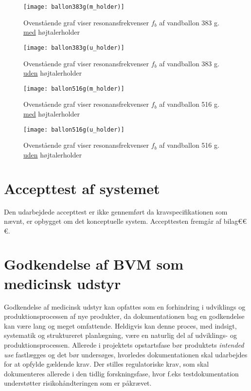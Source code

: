 \begin{figure}[htbp]
  \begin{minipage}[b]{1\linewidth}
    \centering
    \texttt{[image: ballon383g(m\_holder)]}
    \caption{Ovenstående graf viser resonansfrekvenser $f_{b}$  af vandballon 383 g. \underline{med} højtalerholder}
    \label{fig:ballon216g(m_holder)}
    \label{fig:ballon383g(m_holder)}
  \end{minipage}
  \hspace{1cm}
  \begin{minipage}[b]{1\linewidth}
    \centering
    \texttt{[image: ballon383g(u\_holder)]}
    \caption{Ovenstående graf viser resonansfrekvenser $f_{b}$  af vandballon 383 g. \underline{uden} højtalerholder}
    \label{fig:ballon383g(u_holder)}
  \end{minipage}
\end{figure}

\begin{figure}[htbp]
  \begin{minipage}[b]{1\linewidth}
    \centering
    \texttt{[image: ballon516g(m\_holder)]}
    \caption{Ovenstående graf viser resonansfrekvenser $f_{b}$  af vandballon 516 g. \underline{med} højtalerholder}
    \label{fig:ballon516g(m_holder)}
  \end{minipage}
  \hspace{1cm}
  \begin{minipage}[b]{1\linewidth}
    \centering
    \texttt{[image: ballon516g(u\_holder)]}
    \caption{Ovenstående graf viser resonansfrekvenser $f_{b}$  af vandballon 516 g. \underline{uden} højtalerholder}
    \label{fig:ballon516g(u_holder)}
  \end{minipage}
\end{figure}




\section{Accepttest af systemet}
Den udarbejdede accepttest er ikke gennemført da kravspecifikationen som nævnt, er opbygget om det konceptuelle system. Accepttesten fremgår af bilag€€€. 

\section{Godkendelse af BVM som medicinsk udstyr}
Godkendelse af medicinsk udstyr kan opfattes som en forhindring i udviklings og produktionsprocessen af nye produkter, da dokumentationen bag en godkendelse kan være lang og meget omfattende. Heldigvis kan denne proces, med indsigt, systematik og struktureret planlægning, være en naturlig del af udviklings- og produktionsprocessen. Allerede i projektets opstartsfase bør produktets \textit{intended use} fastlægges og det bør undersøges, hvorledes dokumentationen skal udarbejdes for at opfylde gældende krav.
Der stilles regulatoriske krav, som skal dokumenteres allerede i den tidlig forskningsfase, hvor f.eks testdokumentation understøtter risikohåndteringen som er påkrævet. 


